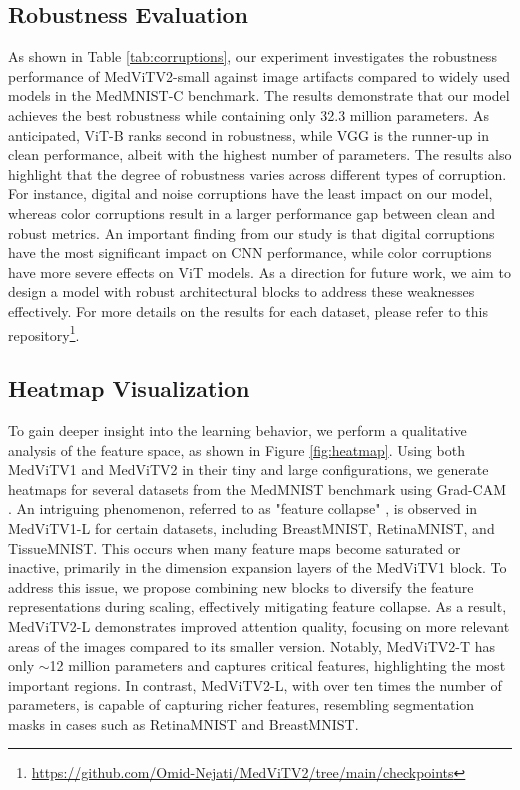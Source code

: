 \documentclass[times,twocolumn,final]{elsarticle}
\begin{document}
\subsection{Robustness Evaluation}
As shown in Table \ref{tab:corruptions}, our experiment investigates the robustness performance of MedViTV2-small against image artifacts compared to widely used models in the MedMNIST-C benchmark. The results demonstrate that our model achieves the best robustness while containing only 32.3 million parameters. As anticipated, ViT-B ranks second in robustness, while VGG is the runner-up in clean performance, albeit with the highest number of parameters.
The results also highlight that the degree of robustness varies across different types of corruption. For instance, digital and noise corruptions have the least impact on our model, whereas color corruptions result in a larger performance gap between clean and robust metrics.
An important finding from our study is that digital corruptions have the most significant impact on CNN performance, while color corruptions have more severe effects on ViT models. As a direction for future work, we aim to design a model with robust architectural blocks to address these weaknesses effectively. For more details on the results for each dataset, please refer to this repository\footnote{\url{https://github.com/Omid-Nejati/MedViTV2/tree/main/checkpoints}}.



\subsection{Heatmap Visualization}
To gain deeper insight into the learning behavior, we perform a qualitative analysis of the feature space, as shown in Figure \ref{fig:heatmap}. Using both MedViTV1 and MedViTV2 in their tiny and large configurations, we generate heatmaps for several datasets from the MedMNIST benchmark using Grad-CAM \cite{selvaraju2020grad}.
An intriguing phenomenon, referred to as "feature collapse" \cite{woo2023convnext}, is observed in MedViTV1-L for certain datasets, including BreastMNIST, RetinaMNIST, and TissueMNIST. This occurs when many feature maps become saturated or inactive, primarily in the dimension expansion layers of the MedViTV1 block. To address this issue, we propose combining new blocks to diversify the feature representations during scaling, effectively mitigating feature collapse.
As a result, MedViTV2-L demonstrates improved attention quality, focusing on more relevant areas of the images compared to its smaller version. Notably, MedViTV2-T has only $\sim$12 million parameters and captures critical features, highlighting the most important regions. In contrast, MedViTV2-L, with over ten times the number of parameters, is capable of capturing richer features, resembling segmentation masks in cases such as RetinaMNIST and BreastMNIST.
\end{document}
